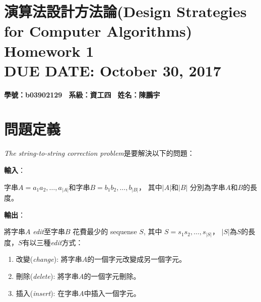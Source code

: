\documentclass[15pt]{extarticle}
\newcommand{\hmwkClass}{演算法設計方法論(Design Strategies for Computer Algorithms)}
\newcommand{\hmwkTitle}{Homework 1}
\newcommand{\hmwkDueDate}{October 30, 2017}
\begin{document}
\thispagestyle{empty}
\section*{\hmwkClass \\
    \normalsize{\hmwkTitle} \\
    \normalsize{DUE DATE: \hmwkDueDate}
}


\hfill \textbf{學號：b03902129 \, 系級：資工四 \, 姓名：陳鵬宇} \\

\section{問題定義}

\textit{The string-to-string correction problem}是要解決以下的問題：\\

\begin{minipage}[t][][t]{0.06\textwidth}
\textbf{輸入}：
\end{minipage}
\begin{minipage}[t][][t]{0.9\textwidth}
字串$A=a_1a_2,\dots, a_{|A|}$和字串$B=b_1b_2,\dots,b_{|B|}$，
其中$|A|$和$|B|$ 分別為字串$A$和$B$的長度。\\
\end{minipage}

\begin{minipage}[t][][t]{0.06\textwidth}
\textbf{輸出}：
\end{minipage}
\begin{minipage}[t][][t]{0.9\textwidth}
將字串$A$ \textit{edit}至字串$B$ 花費最少的 sequense $S$, 其中 $S=s_1s_2,\dots,s_{|S|}$， $|S|$為$S$的長度，$S$有以三種\textit{edit}方式：
\begin{enumerate}
    \item 改變(\textit{change}): 將字串$A$的一個字元改變成另一個字元。
    \item 刪除(\textit{delete}):  將字串$A$的一個字元刪除。
    \item 插入(\textit{insert}): 在字串$A$中插入一個字元。
\end{enumerate}
\end{minipage}
\end{document}
